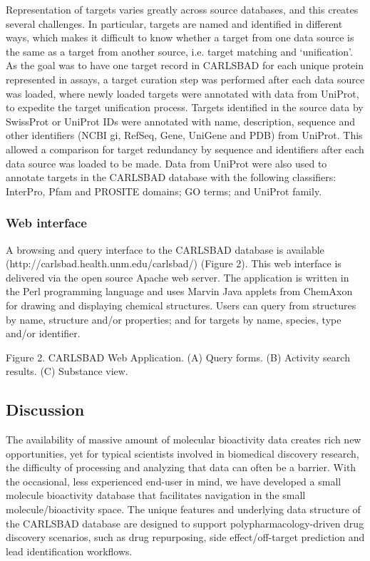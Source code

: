 Representation of targets varies greatly across source databases, and this creates several challenges. In particular, targets are named and identified in different ways, which makes it difficult to know whether a target from one data source is the same as a target from another source, i.e. target matching and ‘unification’. As the goal was to have one target record in CARLSBAD for each unique protein represented in assays, a target curation step was performed after each data source was loaded, where newly loaded targets were annotated with data from UniProt\cite{UniProt_Consortium2018-kq}, to expedite the target unification process. Targets identified in the source data by SwissProt or UniProt IDs were annotated with name, description, sequence and other identifiers (NCBI gi, RefSeq, Gene, UniGene and PDB) from UniProt. This allowed a comparison for target redundancy by sequence and identifiers after each data source was loaded to be made. Data from UniProt were also used to annotate targets in the CARLSBAD database with the following classifiers: InterPro, Pfam and PROSITE domains; GO terms; and UniProt family.

\subsubsection{Web interface}

A browsing and query interface to the CARLSBAD database is available (http://carlsbad.health.unm.edu/carlsbad/) (Figure 2). This web interface is delivered via the open source Apache web server. The application is written in the Perl programming language and uses Marvin Java applets from ChemAxon for drawing and displaying chemical structures. Users can query from structures by name, structure and/or properties; and for targets by name, species, type and/or identifier.

Figure 2.
CARLSBAD Web Application. (A) Query forms. (B) Activity search results. (C) Substance view.

\subsection{Discussion}

The availability of massive amount of molecular bioactivity data creates rich new opportunities, yet for typical scientists involved in biomedical discovery research, the difficulty of processing and analyzing that data can often be a barrier. With the occasional, less experienced end-user in mind, we have developed a small molecule bioactivity database that facilitates navigation in the small molecule/bioactivity space. The unique features and underlying data structure of the CARLSBAD database are designed to support polypharmacology-driven drug discovery scenarios, such as drug repurposing, side effect/off-target prediction and lead identification workflows.

